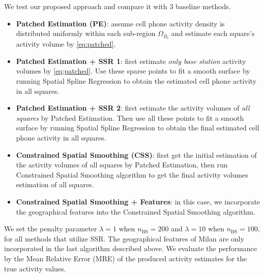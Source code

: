 We test our proposed approach and compare it with 3 baseline methods.
\begin{itemize}
\item \textbf{Patched Estimation (PE)}:
assume cell phone activity density is distributed uniformly within each sub-region $\Omega_{B_i}$
and estimate each square's activity volume by \eqref{eq:patched}.
\item \textbf{Patched Estimation + SSR 1}: first estimate \textit{only base station} activity volumes by \eqref{eq:patched}. Use these sparse points to fit a smooth surface by running Spatial Spline Regression to obtain the estimated cell phone activity in all squares. 
\item \textbf{Patched Estimation + SSR 2}: first estimate the activity volumes of \textit{all squares} by Patched Estimation. Then use all these points to fit a smooth surface by running Spatial Spline Regression to obtain the final estimated cell phone activity in all squares.
\item \textbf{Constrained Spatial Smoothing (CSS)}: first get the initial estimation of the activity volumes of all squares by Patched Estimation, then run Constrained Spatial Smoothing algorithm to get the final activity volumes estimation of all squares.
\item \textbf{Constrained Spatial Smoothing + Features}: in this case, we incorporate the geographical features into the Constrained Spatial Smoothing algorithm.
\end{itemize}

We set the penalty parameter $\lambda = 1$ when $n_{\text{BS}} = 200$ and $\lambda = 10$ when $n_{\text{BS}} = 100$, for all methods that utilize SSR. The geographical features of Milan are only incorporated in the last algorithm described above.
We evaluate the performance by the Mean Relative Error (MRE) of the produced activity estimates for the true activity values. 

